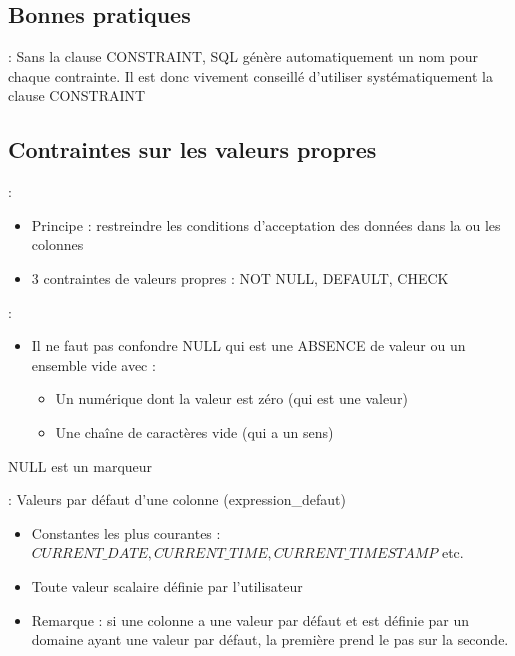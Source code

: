 \documentclass[10pt]{beamer}
\begin{document}
\subsection{Bonnes pratiques}
\begin{frame}{\secname : \subsecname}
    Sans la clause CONSTRAINT, SQL génère automatiquement un nom pour chaque contrainte.
    Il est donc vivement conseillé d’utiliser systématiquement la clause CONSTRAINT
    
\end{frame}

\subsection{Contraintes sur les valeurs propres}
\begin{frame}{\secname : \subsecname}
    \begin{itemize}
        \item Principe : restreindre les conditions d'acceptation des données dans la ou les colonnes
        \item 3 contraintes de valeurs propres : NOT NULL, DEFAULT, CHECK
    \end{itemize}
    
\end{frame}

\begin{frame}{\secname : \subsecname}
    \begin{itemize}
        \item Il ne faut pas confondre NULL qui est une ABSENCE de valeur ou un ensemble vide avec :
              \begin{itemize}
                  \item Un numérique dont la valeur est zéro (qui est une valeur)
                  \item Une chaîne de caractères vide (qui a un sens)
              \end{itemize}
    \end{itemize}
    NULL est un marqueur
\end{frame}

\begin{frame}{\secname : \subsecname}
    Valeurs par défaut d'une colonne (expression\_defaut)

    \begin{itemize}
        \item Constantes les plus courantes : $ CURRENT\_DATE,CURRENT\_TIME,CURRENT\_TIMESTAMP $ etc.
        \item Toute valeur scalaire définie par l'utilisateur
        \item Remarque : si une colonne a une valeur par défaut et est définie par un domaine ayant une valeur par défaut, la première prend le pas sur la seconde.
    \end{itemize}
\end{frame}
\end{document}
